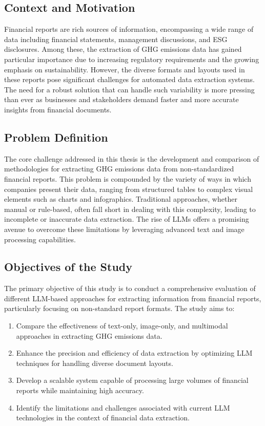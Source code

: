 \documentclass[english, 12pt, a4paper, elec, utf8, a-2b, online]{aaltothesis}
\begin{document}
\subsection{Context and Motivation}

Financial reports are rich sources of information, encompassing a wide range of data including financial statements, management discussions, and \ac{ESG} disclosures. Among these, the extraction of \ac{GHG} emissions data has gained particular importance due to increasing regulatory requirements and the growing emphasis on sustainability. However, the diverse formats and layouts used in these reports pose significant challenges for automated data extraction systems. The need for a robust solution that can handle such variability is more pressing than ever as businesses and stakeholders demand faster and more accurate insights from financial documents.

\subsection{Problem Definition}

The core challenge addressed in this thesis is the development and comparison of methodologies for extracting \ac{GHG} emissions data from non-standardized financial reports. This problem is compounded by the variety of ways in which companies present their data, ranging from structured tables to complex visual elements such as charts and infographics. Traditional approaches, whether manual or rule-based, often fall short in dealing with this complexity, leading to incomplete or inaccurate data extraction. The rise of \acp{LLM} offers a promising avenue to overcome these limitations by leveraging advanced text and image processing capabilities.

\subsection{Objectives of the Study}

The primary objective of this study is to conduct a comprehensive evaluation of different \ac{LLM}-based approaches for extracting information from financial reports, particularly focusing on non-standard report formats. The study aims to:
\begin{enumerate}
\item Compare the effectiveness of text-only, image-only, and multimodal approaches in extracting \ac{GHG} emissions data.
\item Enhance the precision and efficiency of data extraction by optimizing \ac{LLM} techniques for handling diverse document layouts.
\item Develop a scalable system capable of processing large volumes of financial reports while maintaining high accuracy.
\item Identify the limitations and challenges associated with current \ac{LLM} technologies in the context of financial data extraction.
\end{enumerate}
\end{document}
